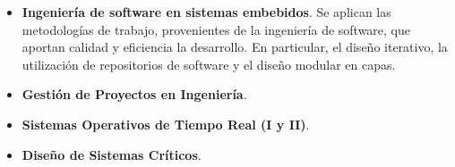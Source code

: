 \begin{itemize}
\item
\textbf{Ingeniería de software en sistemas embebidos}. Se aplican las metodologías de trabajo, provenientes de la ingeniería de software, que aportan calidad y eficiencia la desarrollo. En particular, el diseño iterativo, la utilización de repositorios de software y el diseño modular en capas.
\item
\textbf{Gestión de Proyectos en Ingeniería}. %
\item
\textbf{Sistemas Operativos de Tiempo Real (I y II)}. %
\item
\textbf{Diseño de Sistemas Críticos}.%
\end{itemize}

